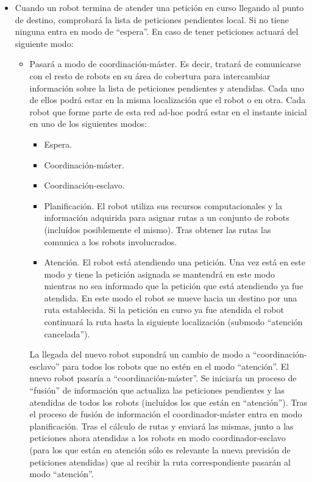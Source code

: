 \documentclass[preprint,12pt]{elsarticle}
\begin{document}
\begin{itemize}
\item{Cuando un robot termina de atender una petición en curso llegando al punto de destino,  comprobará la lista de peticiones pendientes local. Si no tiene ninguna entra en modo de ``espera''. En caso de tener peticiones actuará del siguiente modo:
\begin{itemize}
\item{Pasará a modo de coordinación-máster. Es decir, tratará de comunicarse con el resto de robots en su área de cobertura para intercambiar información sobre la lista de peticiones pendientes y atendidas. Cada uno de ellos podrá estar en la misma localización que el robot o en otra. Cada robot que forme parte de esta red ad-hoc podrá estar en el instante inicial en uno de los siguientes modos:
\begin{itemize}
\item Espera. 
\item Coordinación-máster.
\item Coordinación-esclavo. 
\item Planificación. El robot utiliza sus recursos computacionales y la información adquirida para asignar rutas a un conjunto de robots (incluídos posiblemente el mismo). Tras obtener las rutas las comunica a los robots involucrados. 
\item Atención. El robot está atendiendo una petición. Una vez está en este modo y tiene la petición asignada se mantendrá en este modo mientras no sea informado que la petición que está atendiendo ya fue atendida. En este modo el robot se mueve hacia un destino por una ruta establecida. Si la petición en curso ya fue atendida el robot continuará la ruta hasta la siguiente localización (submodo ``atención cancelada''). 
\end{itemize}

La llegada del nuevo robot supondrá un cambio de modo a ``coordinación-esclavo'' para todos los robots que no estén en el modo ``atención''.  El nuevo robot pasaría a ``coordinación-máster''.  Se iniciaría un proceso de ``fusión'' de información que actualiza las peticiones pendientes y las atendidas de todos los robots (incluídos los que están en ``atención''). Tras el proceso de fusión de información el coordinador-máster entra en modo planificación. Tras el cálculo de rutas y enviará las mismas, junto a las peticiones ahora atendidas  a los robots en modo coordinador-esclavo (para los que están en atención sólo es relevante la nueva previsión de peticiones atendidas) que al recibir la ruta correspondiente pasarán al modo ``atención''. 

}
\end{itemize}}
\end{itemize}
\end{document}

